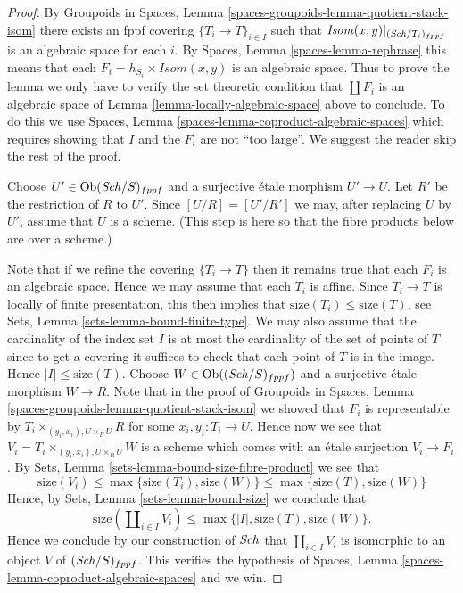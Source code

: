 \begin{proof}
By
Groupoids in Spaces,
Lemma \ref{spaces-groupoids-lemma-quotient-stack-isom}
there exists an fppf covering $\{T_i \to T\}_{i \in I}$
such that $\mathit{Isom}(x, y)|_{(\mathit{Sch}/T_i)_{fppf}}$
is an algebraic space for each $i$. By
Spaces, Lemma \ref{spaces-lemma-rephrase}
this means that each $F_i = h_{S_i} \times \mathit{Isom}(x, y)$
is an algebraic space.
Thus to prove the lemma we only have to verify the set theoretic condition
that $\coprod F_i$ is an algebraic space of
Lemma \ref{lemma-locally-algebraic-space}
above to conclude. To do this we use
Spaces, Lemma \ref{spaces-lemma-coproduct-algebraic-spaces}
which requires showing that $I$ and the $F_i$ are not ``too large''.
We suggest the reader skip the rest of the proof.

\medskip\noindent
Choose $U' \in \mathop{\mathrm{Ob}}\nolimits(\mathit{Sch}/S)_{fppf}$ and a surjective
\'etale morphism $U' \to U$. Let $R'$ be the restriction of $R$ to $U'$.
Since $[U/R] = [U'/R']$ we may, after replacing $U$ by $U'$,
assume that $U$ is a scheme. (This step is here so that the
fibre products below are over a scheme.)

\medskip\noindent
Note that if we refine the covering $\{T_i \to T\}$ then it remains
true that each $F_i$ is an algebraic space.
Hence we may assume that each $T_i$ is affine. Since
$T_i \to T$ is locally of finite presentation, this then implies that
$\text{size}(T_i) \leq \text{size}(T)$, see
Sets, Lemma \ref{sets-lemma-bound-finite-type}.
We may also assume that the cardinality of the index set $I$ is at most the
cardinality of the set of points of $T$ since to get a
covering it suffices to check that each point of $T$ is in the image.
Hence $|I| \leq \text{size}(T)$.
Choose $W \in \mathop{\mathrm{Ob}}\nolimits((\mathit{Sch}/S)_{fppf})$
and a surjective \'etale morphism $W \to R$. Note that in the proof of
Groupoids in Spaces,
Lemma \ref{spaces-groupoids-lemma-quotient-stack-isom}
we showed that $F_i$ is representable by
$T_i \times_{(y_i, x_i), U \times_B U} R$ for some
$x_i, y_i : T_i \to U$. Hence now we see that
$V_i = T_i \times_{(y_i, x_i), U \times_B U} W$ is a
scheme which comes with an \'etale surjection $V_i \to F_i$.
By
Sets, Lemma \ref{sets-lemma-bound-size-fibre-product}
we see that
$$
\text{size}(V_i) \leq \max\{\text{size}(T_i), \text{size}(W)\}
\leq \max\{\text{size}(T), \text{size}(W)\}
$$
Hence, by
Sets, Lemma \ref{sets-lemma-bound-size}
we conclude that
$$
\text{size}(\coprod\nolimits_{i \in I} V_i)
\leq \max\{|I|, \text{size}(T), \text{size}(W)\}.
$$
Hence we conclude by our construction of $\mathit{Sch}$
that $\coprod_{i \in I} V_i$ is isomorphic to an object
$V$ of $(\mathit{Sch}/S)_{fppf}$. This verifies the
hypothesis of
Spaces, Lemma \ref{spaces-lemma-coproduct-algebraic-spaces}
and we win.
\end{proof}

